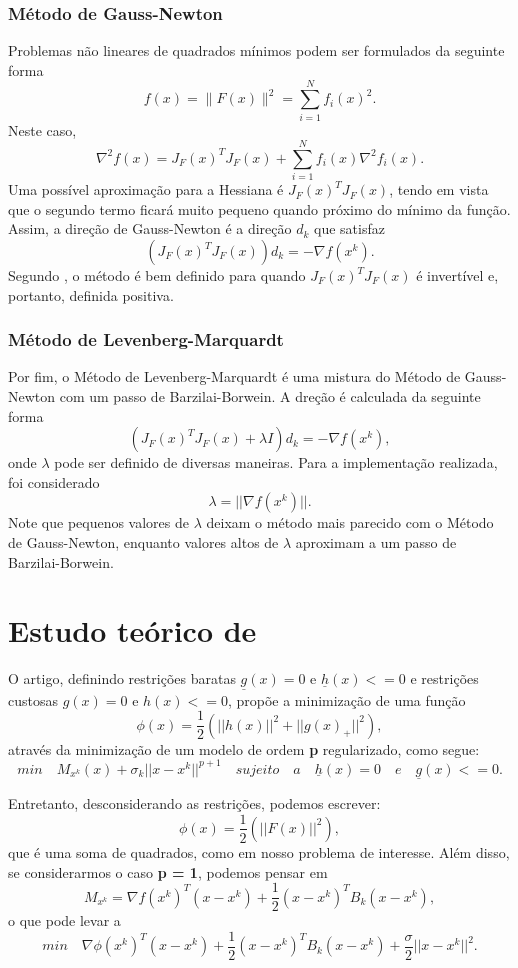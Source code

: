 \documentclass[11pt]{article}
\begin{document}
\subsubsection*{Método de Gauss-Newton}
Problemas não lineares de quadrados mínimos podem ser formulados da seguinte forma 
$$f(x)=\|F(x)\|^2=\sum_{i=1}^N f_i(x)^2.$$
Neste caso, $$\nabla^2 f(x)= J_F(x)^T J_F(x)+\sum_{i=1}^N f_i(x) \nabla^2 f_i(x).$$
Uma possível aproximação para a Hessiana é $J_F(x)^T J_F(x)$, tendo em vista que o segundo termo ficará muito pequeno quando próximo do mínimo da função.
Assim, a direção de Gauss-Newton é a direção $d_k$ que satisfaz $$(J_F(x)^T J_F(x)) d_k = - \nabla f(x^k).$$
Segundo \cite{artigoLevenberg}, o método é bem definido para quando $J_F(x)^T J_F(x)$ é invertível e, portanto, definida positiva. 

\subsubsection*{Método de Levenberg-Marquardt}
Por fim, o Método de Levenberg-Marquardt é uma mistura do Método de Gauss-Newton com um passo de Barzilai-Borwein. A dreção é calculada da seguinte forma
$$(J_F(x)^T J_F(x) + \lambda I) d_k = - \nabla f(x^k),$$
onde $\lambda$ pode ser definido de diversas maneiras. Para a implementação realizada, foi considerado $$\lambda = ||\nabla f(x^k)||.$$ 
Note que pequenos valores de $\lambda$ deixam o método mais parecido com o Método de Gauss-Newton, enquanto valores altos de $\lambda$ aproximam a um passo de Barzilai-Borwein.

\section{Estudo teórico de \cite{bmLS}}
O artigo, definindo restrições baratas $\underline{g}(x) = 0$ e $\underline{h}(x) <= 0$ e restrições custosas $g(x) = 0$ e $h(x) <= 0$, propõe a minimização de uma função 
$$\phi (x) = \frac{1}{2}(||h(x)||^2 + ||g(x)_{+}||^2),$$
através da minimização de um modelo de ordem \textbf{p} regularizado, como segue:
$$min \quad M_{x^{k}}(x) + \sigma _{k}||x - x^{k}||^{p + 1} \quad sujeito\quad a \quad \underline{h}(x) = 0 \quad e \quad \underline{g}(x) <= 0.$$

Entretanto, desconsiderando as restrições, podemos escrever:
$$\phi (x) = \frac{1}{2}(||F(x)||^2),$$ que é uma soma de quadrados, como em nosso problema de interesse. Além disso, se considerarmos o caso \textbf{p = 1}, podemos pensar em $$M_{x^k} = \nabla f(x^k)^T (x - x^k) + \frac{1}{2}(x - x^k)^T B_k (x - x^k),$$ o que pode levar a
$$min \quad \nabla \phi(x^k)^T (x - x^k) + \frac{1}{2}(x - x^k)^T B_k (x - x^k) + \frac{\sigma}{2} ||x - x^k||^2.$$
\end{document}
